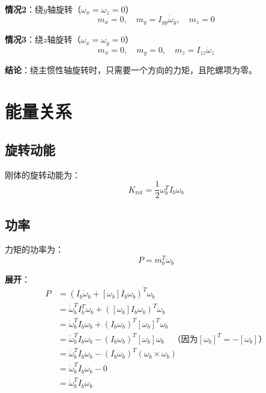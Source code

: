 \documentclass[12pt,a4paper]{article}
\begin{document}
\textbf{情况2}：绕$y$轴旋转（$\omega_x = \omega_z = 0$）
\begin{equation}
m_x = 0, \quad m_y = I_{yy} \dot{\omega}_y, \quad m_z = 0
\end{equation}

\textbf{情况3}：绕$z$轴旋转（$\omega_x = \omega_y = 0$）
\begin{equation}
m_x = 0, \quad m_y = 0, \quad m_z = I_{zz} \dot{\omega}_z
\end{equation}

\textbf{结论}：绕主惯性轴旋转时，只需要一个方向的力矩，且陀螺项为零。

\section{能量关系}

\subsection{旋转动能}

刚体的旋转动能为：
\begin{equation}
K_{\text{rot}} = \frac{1}{2} \omega_b^T I_b \omega_b
\label{eq:rotational_kinetic_energy}
\end{equation}

\subsection{功率}

力矩的功率为：
\begin{equation}
P = m_b^T \omega_b
\end{equation}

\textbf{展开}：
\begin{align}
P &= (I_b \dot{\omega}_b + [\omega_b] I_b \omega_b)^T \omega_b \\
&= \dot{\omega}_b^T I_b^T \omega_b + ([\omega_b] I_b \omega_b)^T \omega_b \\
&= \dot{\omega}_b^T I_b \omega_b + (I_b \omega_b)^T [\omega_b]^T \omega_b \\
&= \dot{\omega}_b^T I_b \omega_b - (I_b \omega_b)^T [\omega_b] \omega_b \quad \text{（因为$[\omega_b]^T = -[\omega_b]$）} \\
&= \dot{\omega}_b^T I_b \omega_b - (I_b \omega_b)^T (\omega_b \times \omega_b) \\
&= \dot{\omega}_b^T I_b \omega_b - 0 \\
&= \dot{\omega}_b^T I_b \omega_b
\end{align}
\end{document}
